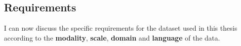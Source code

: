 
\subsection{Requirements}
\label{sec:dataset-requirements}

I can now discuss the specific requirements for the dataset used in this thesis according to the \textbf{modality}, \textbf{scale}, \textbf{domain} and \textbf{language} of the data.

